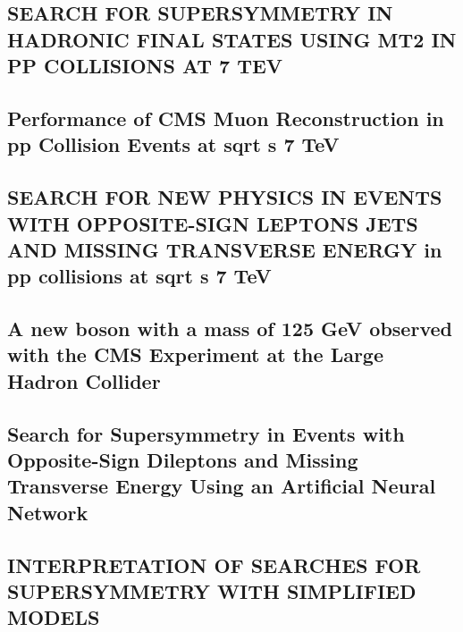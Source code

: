\documentclass[a4paper, 11pt, twoside, openright]{report}
\begin{document}
\subsection{SEARCH FOR SUPERSYMMETRY IN HADRONIC FINAL STATES USING MT2 IN PP COLLISIONS AT 7 TEV}


\subsection{Performance of CMS Muon Reconstruction in pp Collision Events at sqrt s 7 TeV}


\subsection{SEARCH FOR NEW PHYSICS IN EVENTS WITH OPPOSITE-SIGN LEPTONS JETS AND MISSING TRANSVERSE ENERGY in pp collisions at sqrt s 7 TeV}


\subsection{A new boson with a mass of 125 GeV observed with the CMS Experiment at the Large Hadron Collider}


\subsection{Search for Supersymmetry in Events with Opposite-Sign Dileptons and Missing Transverse Energy Using an Artificial Neural Network}


\subsection{INTERPRETATION OF SEARCHES FOR SUPERSYMMETRY WITH SIMPLIFIED MODELS}

\end{document}
